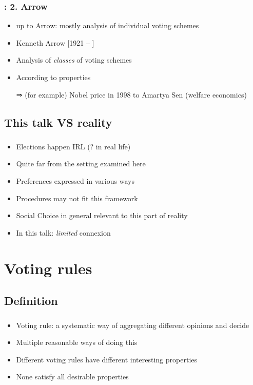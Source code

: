 \documentclass[french,english]{beamer}
\begin{document}
\begin{frame}
	\frametitle{\subsecname: 2. Arrow}
	\begin{itemize}
		\item up to Arrow: mostly analysis of individual voting schemes
		\item Kenneth Arrow [1921 – ]
		\item Analysis of \emph{classes} of voting schemes
		\item According to properties
		\item[⇒] {\tiny (for example)} Nobel price in 1998 to Amartya Sen (welfare economics)
	\end{itemize}
\end{frame}

\subsection{This talk VS reality}
\begin{frame}
	\frametitle{\subsecname}
	\begin{itemize}
		\item Elections happen IRL (? \pause in real life) \pause
		\item Quite far from the setting examined here
		\item Preferences expressed in various ways
		\item Procedures may not fit this framework
		\item Social Choice in general relevant to this part of reality
		\item In this talk: \emph{limited} connexion
	\end{itemize}
\end{frame}

\section{Voting rules}
\subsection{Definition}
\begin{frame}
	\frametitle{\subsecname}
	\begin{itemize}
		\item Voting rule: a systematic way of aggregating different opinions and decide
		\item Multiple reasonable ways of doing this
		\item Different voting rules have different interesting properties
		\item None satisfy all desirable properties
	\end{itemize}
\end{frame}
\end{document}
